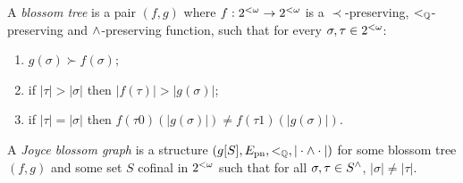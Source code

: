 \begin{definition}\label{def:blossom-tree}
  A \emph{blossom tree} is a pair $(f, g)$
  where $f: {2^{<\omega}} \to {2^{<\omega}}$ is a $\prec$-preserving, $<_{\mathbb{Q}}$-preserving and $\wedge$-preserving function, such that for every $\sigma, \tau \in {2^{<\omega}}$:
  \begin{enumerate}
  \item $g(\sigma) \succ f(\sigma)$; %
  \item if $|\tau| > |\sigma|$ then $|f(\tau)| > |g(\sigma)|$;
  \item\label{it:blossom-rado} if $|\tau| = |\sigma|$ then
   $f(\tau 0)(|g(\sigma)|) \neq f(\tau 1)(|g(\sigma)|)$.
  \end{enumerate}
  A \emph{Joyce blossom graph} is a structure $(g[S],E_{\mathrm{pn}},<_{\mathbb{Q}},|\cdot\wedge\cdot|)$ for some blossom tree $(f,g)$ and some set $S$ cofinal in ${2^{<\omega}}$ such that
   for all $\sigma,\tau\in{S}^{\wedge}$, $|\sigma|\neq|\tau|$.
\end{definition}

